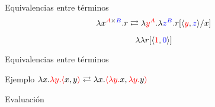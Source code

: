 \begin{frame}{Equivalencias entre términos}	
	\[ \lambda x^{\textcolor{red}{A} \times \textcolor{blue}{B}}. r \rightleftarrows \lambda \textcolor{red}{y^A}. \lambda \textcolor{blue}{z^B}. r[\langle \textcolor{red}{y}, \textcolor{blue}{z} \rangle/x] \]

	\pause
	\[ \lambda \lambda r[\langle \textcolor{red}{1},\textcolor{blue}{0} \rangle] \]
	
	\pause
	
	\pause
	
\end{frame}

\begin{frame}{Equivalencias entre términos}	
\end{frame}

\begin{frame}{Ejemplo}
	$ \lambda x. \textcolor{red}{\lambda y. \langle} x, y \textcolor{red}{\rangle} \rightleftarrows \lambda x. \textcolor{red}{\langle \lambda y.} x, \textcolor{red}{\lambda y.}y \textcolor{red}{\rangle} $
\end{frame}

\iffalse
\begin{frame}{Evaluación}
\end{frame}

